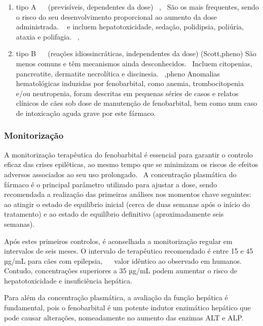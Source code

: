 \begin{enumerate}
    \item	tipo A ~\cite{Bersan2014}~\cite{Walton-Clark2022} (previsíveis, dependentes da dose) ~\cite{Scott2021},~\cite{Bersan2014} São os mais frequentes, sendo o risco do seu desenvolvimento proporcional ao aumento da dose administrada. ~\cite{Scott2021} e incluem hepatotoxicidade, sedação, polidipsia, poliúria, ataxia e polifagia. ~\cite{Scott2021},~\cite{Bersan2014}
    \item tipo B ~\cite{Bersan2014}~\cite{Walton-Clark2022} (reações idiossincráticas, independentes da dose) (Scott,pheno) São menos comuns e têm mecanismos ainda desconhecidos.~\cite{Scott2021} Incluem citopenias, pancreatite, dermatite necrolítica e discinesia. ~\cite{Scott2021},pheno Anomalias hematológicas induzidas por fenobarbital, como anemia, trombocitopenia e/ou neutropenia, foram descritas em pequenas séries de casos e relatos clínicos de cães sob dose de manutenção de fenobarbital, bem como num caso de intoxicação aguda grave por este fármaco.~\cite{Bersan2014}

\end{enumerate}

\subsubsection{Monitorização}


A monitorização terapêutica do fenobarbital é essencial para garantir o controlo eficaz das crises epiléticas, ao mesmo tempo que se minimizam os riscos de efeitos adversos associados ao seu uso prolongado.~\cite{Walton-Clark2022} A concentração plasmática do fármaco é o principal parâmetro utilizado para ajustar a dose, sendo recomendada a realização das primeiras análises nos momentos chave seguintes: ao atingir o estado de equilíbrio inicial (cerca de duas semanas após o início do tratamento) e ao estado de equilíbrio definitivo (aproximadamente seis semanas).~\cite{Podell2016} 


Após estes primeiros controlos, é aconselhada a monitorização regular em intervalos de seis meses. O intervalo de terapêutico recomendado é entre 15 e 45 µg/mL para cães com epilepsia, ~\cite{Walton-Clark2022}~\cite{Trinka2023} valor idêntico ao observado em humanos. Contudo, concentrações superiores a 35 µg/mL podem aumentar o risco de hepatotoxicidade e insuficiência hepática.~\cite{Walton-Clark2022}~\cite{Jukier2023}~\cite{Chandler2011}


Para além da concentração plasmática, a avaliação da função hepática é fundamental, pois o fenobarbital é um potente indutor enzimático hepático que pode causar alterações, nomeadamente no aumento das enzimas ALT e ALP. ~\cite{Gieger2000,Muller2000} 



